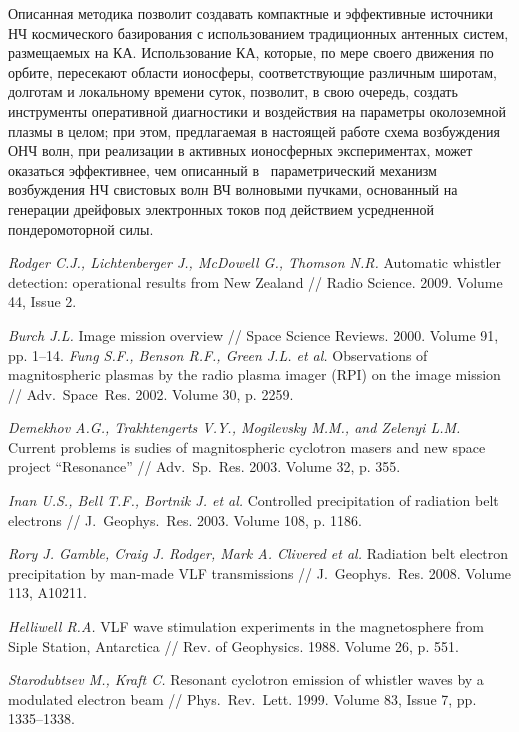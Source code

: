 \documentclass[10pt]{disser}
\begin{document}
Описанная методика позволит создавать компактные и эффективные источники НЧ космического базирования с использованием традиционных антенных систем, размещаемых на КА. Использование КА, которые, по мере своего движения по орбите, пересекают  области ионосферы, соответствующие различным широтам, долготам и локальному времени суток, позволит, в свою очередь, создать инструменты оперативной диагностики и воздействия на параметры околоземной плазмы в целом; при этом, предлагаемая в настоящей работе схема возбуждения ОНЧ волн, при реализации в активных ионосферных экспериментах, может оказаться эффективнее, чем описанный  в~\cite{Gushchin} параметрический механизм возбуждения НЧ свистовых волн ВЧ волновыми пучками, основанный на генерации дрейфовых электронных токов под действием усредненной пондеромоторной силы.
\begin{thebibliography}{99}

\textit{Rodger C.J.,  Lichtenberger J., McDowell G., Thomson N.R.} Automatic whistler detection: operational results from New Zealand // Radio Science. 2009. Volume 44, Issue 2. %

\textit{Burch J.L.} Image mission overview // Space Science Reviews. 2000.  Volume 91, pp. 1--14. %
\textit{Fung S.F., Benson R.F., Green J.L. et al.} Observations of magnitospheric plasmas by the radio plasma imager (RPI) on the image mission // Adv.~Space~Res. 2002. Volume 30, p. 2259. %

\textit{Demekhov A.G., Trakhtengerts V.Y., Mogilevsky M.M., and Zelenyi L.M.} Current problems is sudies of magnitospheric cyclotron masers and new space project ``Resonance'' // Adv.~Sp.~Res. 2003. Volume 32, p. 355. %

\textit{Inan U.S., Bell T.F., Bortnik J. et al.} Controlled precipitation of radiation belt electrons // J.~Geophys.~Res. 2003. Volume 108, p. 1186.%

\textit{Rory J. Gamble, Craig J. Rodger, Mark A. Clivered et al.} Radiation belt electron precipitation by man-made VLF transmissions // J.~Geophys.~Res. 2008. Volume 113, A10211. %

\textit{Helliwell R.A.} VLF wave stimulation experiments in the magnetosphere from Siple Station, Antarctica // Rev. of Geophysics. 1988. Volume 26, p. 551. %

\textit{Starodubtsev M., Kraft C.} Resonant cyclotron emission of whistler waves by a modulated electron beam // Phys.~Rev.~Lett. 1999. Volume 83, Issue 7, pp. 1335--1338. 


\end{thebibliography}
\end{document}
